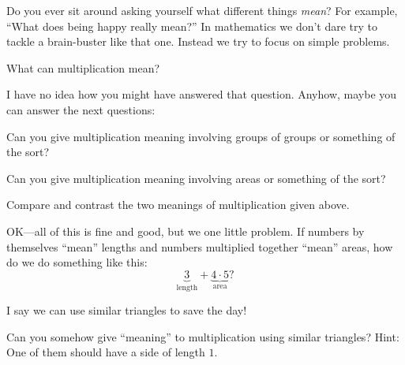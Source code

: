 Do you ever sit around asking yourself what different things
\textit{mean}? For example, ``What does being happy really mean?'' In
mathematics we don't dare try to tackle a brain-buster like that
one. Instead we try to focus on simple problems.

\begin{question} What can multiplication mean? 
\end{question}
\QM

I have no idea how you might have answered that question. Anyhow,
maybe you can answer the next questions:

\begin{question} 
Can you give multiplication meaning involving groups of groups or
something of the sort?
\end{question}
\QM

\begin{question} 
Can you give multiplication meaning involving areas or something of
the sort?
\end{question}
\QM

\begin{question}
Compare and contrast the two meanings of multiplication given above.
\end{question}

OK---all of this is fine and good, but we one little problem. If
numbers by themselves ``mean'' lengths and numbers multiplied together
``mean'' areas, how do we do something like this:
\[
\underbrace{3}_\text{length} + \underbrace{4\cdot 5}_\text{area}?
\]


I say we can use similar triangles to save the day!


\begin{question} 
Can you somehow give ``meaning'' to multiplication using similar
triangles? Hint: One of them should have a side of length $1$.
\end{question}
\QM

